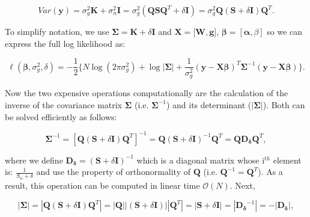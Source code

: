 \begin{equation}\label{eq:fast_lmm_full_covariance}
 Var(\mathbf{y}) = \sigma_g^2\mathbf{K} + \sigma_n^2\mathbf{I} = \sigma_g^2(\mathbf{Q}\mathbf{S}\mathbf{Q}^T + \delta\mathbf{I})= \sigma_g^2\mathbf{Q} (\mathbf{S} + \delta\mathbf{I})\mathbf{Q}^T.
\end{equation}

\vspace{4mm}

To simplify notation, we use $\boldsymbol{\Sigma} = \mathbf{K} + \delta\mathbf{I}$ and $\mathbf{X} = [\mathbf{W}, \mathbf{g}$], $\boldsymbol{\beta} = [\boldsymbol{\alpha}, \beta]$ so we can express the full log likelihood as:

\begin{equation} \label{eq:fast_lmm_log_likelihood}
 \ell(\boldsymbol{\beta}, \sigma_g^2, \delta) = -\frac{1}{2} \bigg\{N\log(2\pi\sigma_g^2) + \log{|\boldsymbol{\Sigma}|}+ \frac{1}{\sigma_g^2}(\mathbf{y}-\mathbf{X}\boldsymbol{\beta})^T\boldsymbol{\Sigma}^{-1}(\mathbf{y}-\mathbf{X}\boldsymbol{\beta}) \bigg\}. 
\end{equation}

Now the two expensive operations computationally are the calculation of the inverse of the covariance matrix $\boldsymbol{\Sigma}$ (i.e. $\boldsymbol{\Sigma}^{-1}$) and its determinant ($|\boldsymbol{\Sigma}|$). 
Both can be solved efficiently as follows:  

\begin{equation}\label{eq:fast_lmm_Sigma_inverse}
    \boldsymbol{\Sigma}^{-1} = [\mathbf{Q} (\mathbf{S} + \delta\mathbf{I})\mathbf{Q}^T]^{-1} = \mathbf{Q} (\mathbf{S} + \delta\mathbf{I})^{-1}\mathbf{Q}^T = \mathbf{Q} \mathbf{D_{\delta}}\mathbf{Q}^T,
\end{equation}

where we define $\mathbf{D_{\delta}}=(\mathbf{S} + \delta\mathbf{I})^{-1}$ which is a diagonal matrix whose i$^{th}$ element is: $\frac{1}{S_{ii} + \delta}$ and use the property of orthonormality of $\mathbf{Q}$ (i.e. $\mathbf{Q}^{-1} = \mathbf{Q}^T$).
As a result, this operation can be computed in linear time $\mathcal{O}(N)$. 
Next,

\begin{equation}\label{eq:fast_lmm_Sigma_determinant}
    |\boldsymbol{\Sigma}| = |\mathbf{Q} (\mathbf{S} + \delta\mathbf{I})\mathbf{Q}^T|= |\mathbf{Q}||(\mathbf{S} + \delta\mathbf{I})||\mathbf{Q}^T| = |\mathbf{S} + \delta\mathbf{I}| = |\mathbf{D_{\delta}}^{-1}| = - |\mathbf{D_{\delta}}|,
\end{equation}


